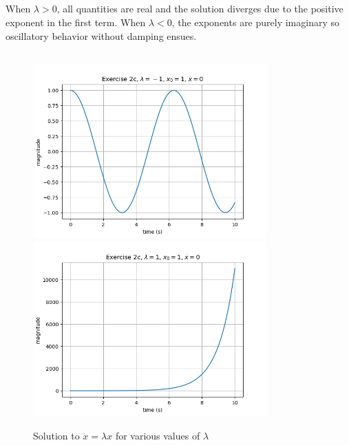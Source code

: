 \documentclass[11pt]{article}
\begin{document}
\subsection{}  %
When $\lambda > 0$, all quantities are real and the solution diverges due to the positive exponent in the first term. When $\lambda < 0$, the exponents are purely imaginary so oscillatory behavior without damping ensues.

\subsection{}  %
\begin{figure}[H]
    \centering
    \includegraphics[width=0.8\textwidth]{2c_fig1.png}
    \includegraphics[width=0.8\textwidth]{2c_fig2.png}
    \caption{Solution to $\ddot{x}=\lambda x$ for various values of $\lambda$}
    \label{fig_2c1}
\end{figure}
\end{document}
